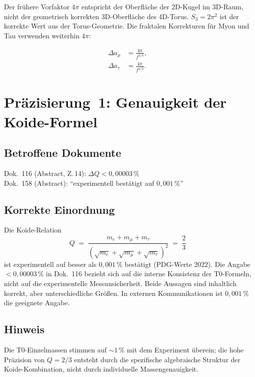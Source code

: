 Der frühere Vorfaktor $4\pi$ entspricht der Oberfläche der 2D-Kugel im
3D-Raum, nicht der geometrisch korrekten 3D-Oberfläche des 4D-Torus.
$S_3 = 2\pi^2$ ist der korrekte Wert aus der Torus-Geometrie. Die
fraktalen Korrekturen für Myon und Tau verwenden weiterhin $4\pi$:

\begin{align}
  \Delta a_\mu  &= \frac{4\pi}{f^{5/3}}, \tag{190.5}\\
  \Delta a_\tau &= \frac{4\pi}{f^{4/3}}. \tag{190.6}
\end{align}

\section{Präzisierung~1: Genauigkeit der Koide-Formel}

\subsection*{Betroffene Dokumente}

Dok.~116 (Abstract, Z.\,14): $\Delta Q < 0{,}00003\,\%$ \\
Dok.~158 (Abstract): \enquote{experimentell bestätigt auf $0{,}001\,\%$}

\subsection*{Korrekte Einordnung}

Die Koide-Relation
\begin{equation}
  Q \;=\; \frac{m_e + m_\mu + m_\tau}
               {(\sqrt{m_e}+\sqrt{m_\mu}+\sqrt{m_\tau})^2}
  \;=\; \frac{2}{3}
  \tag{190.7}
\end{equation}
ist experimentell auf besser als $0{,}001\,\%$ bestätigt
(PDG-Werte 2022). Die Angabe $< 0{,}00003\,\%$ in Dok.~116 bezieht
sich auf die interne Konsistenz der T0-Formeln, nicht auf die
experimentelle Messunsicherheit. Beide Aussagen sind inhaltlich korrekt,
aber unterschiedliche Größen. In externen Kommunikationen ist
$0{,}001\,\%$ die geeignete Angabe.

\subsection*{Hinweis}

Die T0-Einzelmassen stimmen auf $\sim 1\,\%$ mit dem Experiment überein;
die hohe Präzision von $Q = 2/3$ entsteht durch die spezifische
algebraische Struktur der Koide-Kombination, nicht durch individuelle
Massengenauigkeit.

